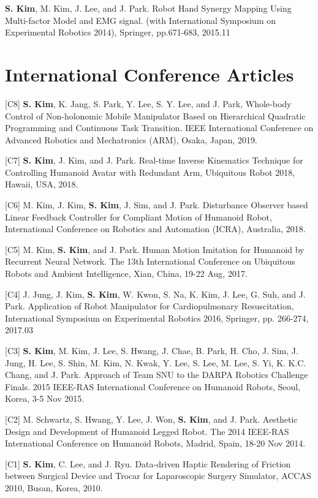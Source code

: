 \documentclass[margin,line]{res}
\begin{document}
\begin{resume}
[J1] \textbf{S. Kim}, M. Kim, J. Lee, and {J. Park}.
Robot Hand Synergy Mapping Using Multi-factor Model and EMG signal.
(with International Symposium on Experimental Robotics 2014), Springer, pp.671-683, 2015.11

\section{\sc International Conference Articles}
[C8] \textbf{S. Kim}, K. Jang, S. Park, Y. Lee, S. Y. Lee, and J. Park, Whole-body Control of Non-holonomic Mobile Manipulator Based on Hierarchical Quadratic Programming and Continuous Task Transition. IEEE International Conference on Advanced Robotics and Mechatronics (ARM), Osaka, Japan, 2019.

[C7] \textbf{S. Kim}, J. Kim, and J. Park.
Real-time Inverse Kinematics Technique for Controlling Humanoid Avatar with Redundant Arm,
Ubiquitous Robot 2018, Hawaii, USA, 2018.

[C6] M. Kim, J. Kim, \textbf{S. Kim}, J. Sim, and J. Park.
Disturbance Observer based Linear Feedback Controller for Compliant Motion of Humanoid Robot,
International Conference on Robotics and Automation (ICRA), Australia, 2018.

[C5] M. Kim, \textbf{S. Kim}, and {J. Park}.
Human Motion Imitation for Humanoid by Recurrent Neural Network.
The 13th International Conference on Ubiquitous Robots and Ambient Intelligence,
Xian, China, 19-22 Aug, 2017.


[C4] J. Jung, J. Kim, \textbf{S. Kim}, W. Kwon, S. Na, K. Kim, J. Lee, G. Suh, and J. Park.
Application of Robot Manipulator for Cardiopulmonary Resuscitation,  International Symposium on Experimental Robotics 2016, Springer, pp. 266-274, 2017.03

[C3] \textbf{S. Kim}, M. Kim, J. Lee, S. Hwang, J. Chae, B. Park, H. Cho, J. Sim, J. Jung, H. Lee, S. Shin, M. Kim, N. Kwak, Y. Lee, S. Lee, M. Lee, S. Yi, K. K.C. Chang, and {J. Park}.
Approach of Team SNU to the DARPA Robotics Challenge Finals.
2015 IEEE-RAS International Conference on Humanoid Robots,
Seoul, Korea, 3-5 Nov 2015.

[C2] M. Schwartz, S. Hwang, Y. Lee, J. Won, \textbf{S. Kim}, and {J. Park}.
Aesthetic Design and Development of Humanoid Legged Robot.
The 2014 IEEE-RAS International Conference on Humanoid Robots,
Madrid, Spain, 18-20 Nov 2014.

[C1] \textbf{S. Kim}, C. Lee, and J. Ryu.
Data-driven Haptic Rendering of Friction between Surgical Device and Trocar for Laparoscopic Surgery Simulator,
ACCAS 2010, Busan, Korea, 2010.


\end{resume}
\end{document}
